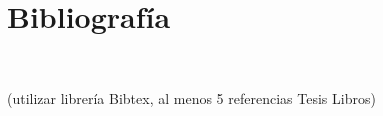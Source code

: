 \section{Bibliografía} 
\textbf{}\\
\begin{flushleft}

\begin{itemize}

\end{itemize} 
\item (utilizar librería Bibtex, al menos 5 referencias Tesis Libros)

\end{flushleft}